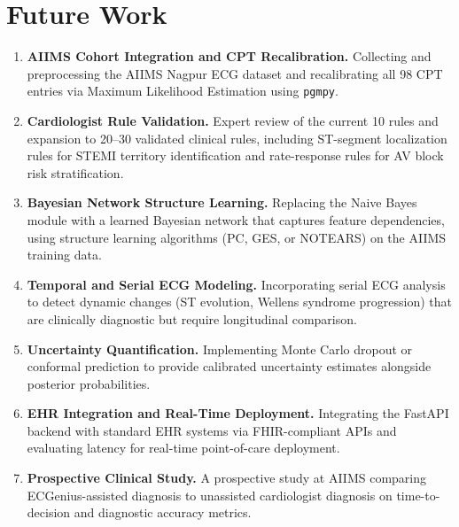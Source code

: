 \documentclass[journal]{IEEEtran}
\begin{document}
\section{Future Work}
\label{sec:future}

\begin{enumerate}
  \item \textbf{AIIMS Cohort Integration and CPT Recalibration.}
        Collecting and preprocessing the AIIMS Nagpur ECG dataset
        and recalibrating all 98 CPT entries via Maximum Likelihood
        Estimation using \texttt{pgmpy}.

  \item \textbf{Cardiologist Rule Validation.}
        Expert review of the current 10 rules and expansion to
        20–30 validated clinical rules, including ST-segment
        localization rules for STEMI territory identification and
        rate-response rules for AV block risk stratification.

  \item \textbf{Bayesian Network Structure Learning.}
        Replacing the Naive Bayes module with a learned Bayesian
        network that captures feature dependencies, using
        structure learning algorithms (PC, GES, or NOTEARS)
        on the AIIMS training data.

  \item \textbf{Temporal and Serial ECG Modeling.}
        Incorporating serial ECG analysis to detect dynamic
        changes (ST evolution, Wellens syndrome progression)
        that are clinically diagnostic but require longitudinal
        comparison.

  \item \textbf{Uncertainty Quantification.}
        Implementing Monte Carlo dropout or conformal prediction
        to provide calibrated uncertainty estimates alongside
        posterior probabilities.

  \item \textbf{EHR Integration and Real-Time Deployment.}
        Integrating the FastAPI backend with standard EHR systems
        via FHIR-compliant APIs and evaluating latency for
        real-time point-of-care deployment.

  \item \textbf{Prospective Clinical Study.}
        A prospective study at AIIMS comparing ECGenius-assisted
        diagnosis to unassisted cardiologist diagnosis on
        time-to-decision and diagnostic accuracy metrics.
\end{enumerate}
\end{document}
